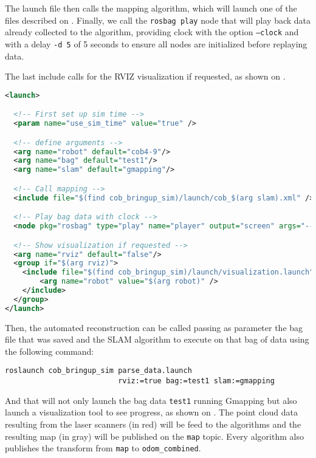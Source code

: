The launch file then calls the mapping algorithm, which will launch one of the files described on . Finally, we call the \texttt{rosbag play} node that will play back data already collected to the algorithm, providing clock with the option \texttt{--clock} and with a delay \texttt{-d 5} of 5 seconds to ensure all nodes are initialized before replaying data.

The last include calls for the RVIZ visualization if requested, as shown on .

\begin{lstlisting}[caption={Automated data parser.},label={lst:parser},language=XML]
<launch>

  <!-- First set up sim time -->
  <param name="use_sim_time" value="true" />

  <!-- define arguments -->
  <arg name="robot" default="cob4-9"/>
  <arg name="bag" default="test1"/>
  <arg name="slam" default="gmapping"/>

  <!-- Call mapping -->
  <include file="$(find cob_bringup_sim)/launch/cob_$(arg slam).xml" />

  <!-- Play bag data with clock -->
  <node pkg="rosbag" type="play" name="player" output="screen" args="--clock -q -d 5 $(find cob_bringup_sim)/bags/$(arg bag).bag"/>

  <!-- Show visualization if requested -->
  <arg name="rviz" default="false"/>
  <group if="$(arg rviz)">
    <include file="$(find cob_bringup_sim)/launch/visualization.launch" >
        <arg name="robot" value="$(arg robot)" />
    </include>
  </group>
</launch>
\end{lstlisting}

Then, the automated reconstruction can be called passing as parameter the bag file that was saved and the SLAM algorithm to execute on that bag of data using the following command:

\begin{verbatim}
roslaunch cob_bringup_sim parse_data.launch
                          rviz:=true bag:=test1 slam:=gmapping
\end{verbatim}

And that will not only launch the bag data \texttt{test1} running Gmapping but also launch a visualization tool to see progress, as shown on . The point cloud data resulting from the laser scanners (in red) will be feed to the algorithms and the resulting map (in gray) will be published on the \texttt{map} topic. Every algorithm also publishes the transform from \texttt{map} to \texttt{odom\_combined}.

